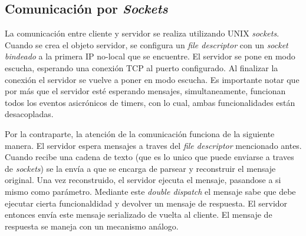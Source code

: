     \subsection{Comunicaci\'on por \textit{Sockets}}
      La comunicaci\'on entre cliente y servidor se realiza utilizando \textsc{UNIX}
      \textit{sockets}.
      Cuando se crea el objeto servidor, se configura un \textit{file descriptor} con
      un \textit{socket} \textit{bindeado} a la primera IP no-local que se encuentre.
      El servidor se pone en modo escucha, esperando una conexi\'on \textsc{TCP}
      al puerto configurado. Al finalizar la conexi\'on el servidor se vuelve a poner
      en modo escucha.
      Es importante notar que por m\'as que el servidor est\'e esperando mensajes,
      simultaneamente, funcionan todos los eventos asicr\'onicos de timers, con lo cual,
      ambas funcionalidades est\'an desacopladas.

      Por la contraparte, la atenci\'on de la comunicaci\'on funciona de la siguiente manera.
      El servidor espera mensajes a traves del \textit{file descriptor} mencionado antes.
      Cuando recibe una cadena de texto (que es lo unico que puede enviarse a traves de
      \textit{sockets}) se la env\'ia a \constructorMensaje{} que se encarga de
      parsear y reconstruir el mensaje original.
      Una vez reconstruido, el servidor ejecuta el mensaje, pasandose a si mismo como par\'ametro.
      Mediante este \textit{double dispatch} el mensaje sabe que debe ejecutar cierta funcionaldidad
      y devolver un mensaje de respuesta. El servidor entonces env\'ia este mensaje serializado
      de vuelta al cliente. El mensaje de respuesta se maneja con un mecanismo an\'alogo.



